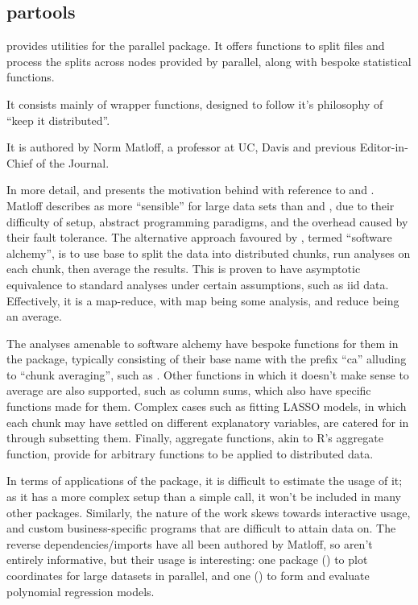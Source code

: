 \subsection{partools}\label{subsec:partools}

 provides utilities for the parallel
package\cite{matloff16softw_alchemy}. It offers functions to split
files and process the splits across nodes provided by parallel, along
with bespoke statistical functions.

It consists mainly of wrapper functions, designed to follow it's
philosophy of ``keep it distributed''.

It is authored by Norm Matloff, a professor at UC, Davis and previous
Editor-in-Chief of the \R{} Journal.

In more detail, \textcite{matloff15} and \textcite{matloff17} presents the
motivation behind  with reference to  and . Matloff
describes  as more ``sensible'' for large data sets than 
and , due to their difficulty of setup, abstract programming
paradigms, and the overhead caused by their fault tolerance. The
alternative approach favoured by , termed ``software alchemy'',
is to use base \R{} to split the data into distributed chunks, run analyses
on each chunk, then average the results. This is proven to have
asymptotic equivalence to standard analyses under certain assumptions,
such as iid data. Effectively, it is a map-reduce, with map being some
analysis, and reduce being an average.

The analyses amenable to software alchemy have bespoke functions for
them in the package, typically consisting of their base \R{} name with the
prefix ``ca'' alluding to ``chunk averaging'', such as
. Other functions in which it
doesn't make sense to average are also supported, such as column sums,
which also have specific functions made for them. Complex cases such as
fitting LASSO models, in which each chunk may have settled on different
explanatory variables, are catered for in  through subsetting
them. Finally, aggregate functions, akin to R's aggregate function,
provide for arbitrary functions to be applied to distributed data.

In terms of applications of the package, it is difficult to estimate the
usage of it; as it has a more complex setup than a simple
 call, it won't be included in many other packages.
Similarly, the nature of the work skews towards interactive usage, and
custom business-specific programs that are difficult to attain data on.
The reverse dependencies/imports have all been authored by Matloff, so
aren't entirely informative, but their usage is interesting: one package
() to plot coordinates for large datasets in parallel, and one
() to form and evaluate polynomial regression models.

